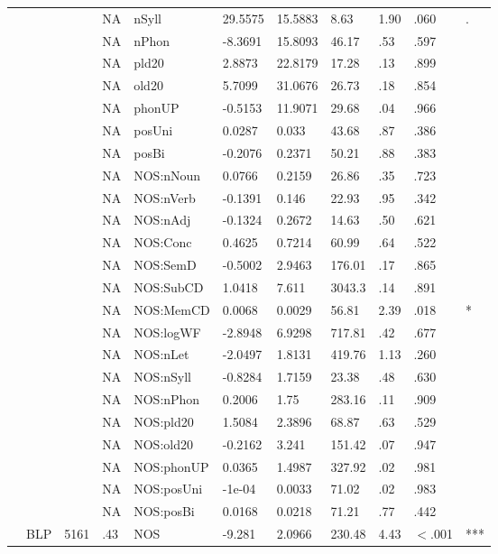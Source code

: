 \begin{table}[ht]
\begin{tabular}{lllllllllll}
   &  &  & NA & nSyll & 29.5575 & 15.5883 & 8.63 & 1.90 & .060 & . \\ 
   &  &  & NA & nPhon & -8.3691 & 15.8093 & 46.17 & .53 & .597 &   \\ 
   &  &  & NA & pld20 & 2.8873 & 22.8179 & 17.28 & .13 & .899 &   \\ 
   &  &  & NA & old20 & 5.7099 & 31.0676 & 26.73 & .18 & .854 &   \\ 
   &  &  & NA & phonUP & -0.5153 & 11.9071 & 29.68 & .04 & .966 &   \\ 
   &  &  & NA & posUni & 0.0287 & 0.033 & 43.68 & .87 & .386 &   \\ 
   &  &  & NA & posBi & -0.2076 & 0.2371 & 50.21 & .88 & .383 &   \\ 
   &  &  & NA & NOS:nNoun & 0.0766 & 0.2159 & 26.86 & .35 & .723 &   \\ 
   &  &  & NA & NOS:nVerb & -0.1391 & 0.146 & 22.93 & .95 & .342 &   \\ 
   &  &  & NA & NOS:nAdj & -0.1324 & 0.2672 & 14.63 & .50 & .621 &   \\ 
   &  &  & NA & NOS:Conc & 0.4625 & 0.7214 & 60.99 & .64 & .522 &   \\ 
   &  &  & NA & NOS:SemD & -0.5002 & 2.9463 & 176.01 & .17 & .865 &   \\ 
   &  &  & NA & NOS:SubCD & 1.0418 & 7.611 & 3043.3 & .14 & .891 &   \\ 
   &  &  & NA & NOS:MemCD & 0.0068 & 0.0029 & 56.81 & 2.39 & .018 & * \\ 
   &  &  & NA & NOS:logWF & -2.8948 & 6.9298 & 717.81 & .42 & .677 &   \\ 
   &  &  & NA & NOS:nLet & -2.0497 & 1.8131 & 419.76 & 1.13 & .260 &   \\ 
   &  &  & NA & NOS:nSyll & -0.8284 & 1.7159 & 23.38 & .48 & .630 &   \\ 
   &  &  & NA & NOS:nPhon & 0.2006 & 1.75 & 283.16 & .11 & .909 &   \\ 
   &  &  & NA & NOS:pld20 & 1.5084 & 2.3896 & 68.87 & .63 & .529 &   \\ 
   &  &  & NA & NOS:old20 & -0.2162 & 3.241 & 151.42 & .07 & .947 &   \\ 
   &  &  & NA & NOS:phonUP & 0.0365 & 1.4987 & 327.92 & .02 & .981 &   \\ 
   &  &  & NA & NOS:posUni & -1e-04 & 0.0033 & 71.02 & .02 & .983 &   \\ 
   &  &  & NA & NOS:posBi & 0.0168 & 0.0218 & 71.21 & .77 & .442 &   \\ 
   & BLP & 5161 & .43 & NOS & -9.281 & 2.0966 & 230.48 & 4.43 & $<$.001 & *** \\ 

\end{tabular}
\end{table}
